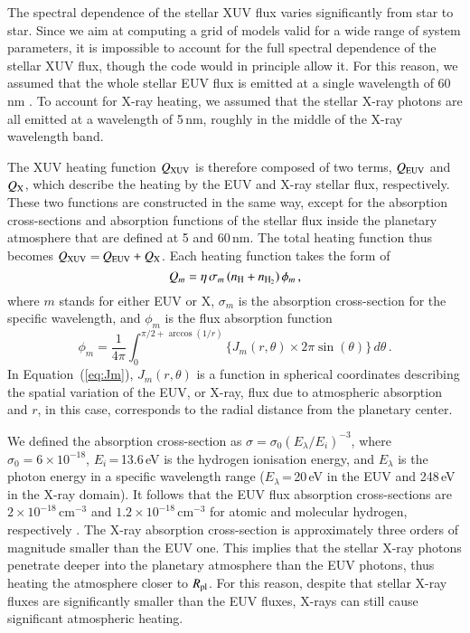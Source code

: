 \documentclass{aa}
\def\qxuv{Q_{\rm XUV}}
\def\nh{n_{\rm H}}
\def\nhh{n_{\rm H_2}}
\def\Rpl{$R_{\rm pl}$}
\begin{document}
The spectral dependence of the stellar XUV flux varies significantly from star to star. Since we aim at computing a grid of models valid for a wide range of system parameters, it is impossible to account for the full spectral dependence of the stellar XUV flux, though the code would in principle allow it. For this reason, we assumed that the whole stellar EUV flux is emitted at a single wavelength of 60\,nm \citep{murray2009}. To account for X-ray heating, we assumed that the stellar X-ray photons are all emitted at a wavelength of 5\,nm, roughly in the middle of the X-ray wavelength band.

The XUV heating function $\qxuv$ is therefore composed of two terms, $Q_{\rm EUV}$ and $Q_{\rm X}$, which describe the heating by the EUV and X-ray stellar flux, respectively. These two functions are constructed in the same way, except for the absorption cross-sections and absorption functions of the stellar flux inside the planetary atmosphere that are defined at 5 and 60\,nm. The total heating function thus becomes $\qxuv$\,=\,$Q_{\rm EUV} + Q_{\rm X}$. Each heating function takes the form of
%
\begin{equation}\label{eq:Qxuv}
Q_{m} = \eta\,\sigma_{m}\,(\nh+\nhh)\,\phi_{m}\,,
\end{equation}
%
where $m$ stands for either EUV or X, $\sigma_{m}$ is the absorption cross-section for the specific wavelength, and $\phi_{m}$ is the flux absorption function
%
\begin{equation}
\label{eq:Jm}
\phi_{m} = \frac{1}{4\pi}\int_{0}^{{\pi}/{2}+\arccos({1}/{r})}\{J_{m}(r,\theta) \times 2\pi \sin(\theta) \}\,d\theta\,.
\end{equation}
%
In Equation~(\ref{eq:Jm}), $J_{m}(r,\theta)$ is a function in spherical coordinates describing the spatial variation of the EUV, or X-ray, flux due to atmospheric absorption \citep{erkaev2015} and $r$, in this case, corresponds to the radial distance from the planetary center.

We defined the absorption cross-section as $\sigma = \sigma_0\left({E_{\lambda}}/{E_{i}}\right)^{-3}$, where $\sigma_0 = 6\times10^{-18}$, $E_{i}$\,=\,13.6\,eV is the hydrogen ionisation energy, and $E_{\lambda}$ is the photon energy in a specific wavelength range ($E_{\lambda}$\,=\,20\,eV in the EUV and 248\,eV in the X-ray domain). It follows that the EUV flux absorption cross-sections are $2\times10^{-18}$\,cm$^{-3}$ and $1.2\times10^{-18}$\,cm$^{-3}$ for atomic and molecular hydrogen, respectively \citep{spitzer1978}. The X-ray absorption cross-section is approximately three orders of magnitude smaller than the EUV one. This implies that the stellar X-ray photons penetrate deeper into the planetary atmosphere than the EUV photons, thus heating the atmosphere closer to \Rpl. For this reason, despite that stellar X-ray fluxes are significantly smaller than the EUV
fluxes, X-rays can still cause significant atmospheric heating.
\end{document}
